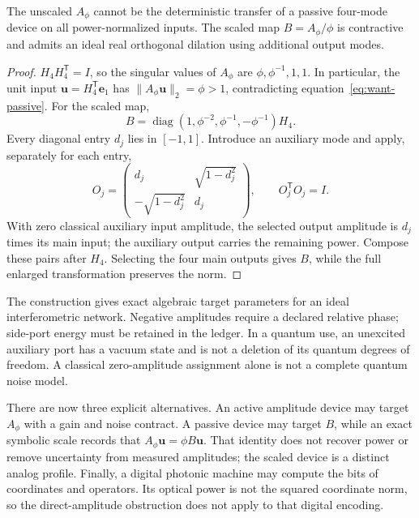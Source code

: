 \begin{proposition}
The unscaled $A_\phi$ cannot be the deterministic transfer of a passive
four-mode device on all power-normalized inputs. The scaled map
$B=A_\phi/\phi$ is contractive and admits an ideal real orthogonal dilation
using additional output modes.
\end{proposition}
\begin{proof}
$H_4H_4^{\mathsf T}=I$, so the singular values of $A_\phi$ are
$\phi,\phi^{-1},1,1$. In particular, the unit input
$\mathbf u=H_4^{\mathsf T}\mathbf e_1$ has
$\|A_\phi\mathbf u\|_2=\phi>1$, contradicting
equation~\eqref{eq:want-passive}. For the scaled map,
\begin{equation}
 B=\operatorname{diag}(1,\phi^{-2},\phi^{-1},-\phi^{-1})H_4.
 \label{eq:want-pinion-scaled}
\end{equation}
Every diagonal entry $d_j$ lies in $[-1,1]$. Introduce an auxiliary mode and
apply, separately for each entry,
\begin{equation}
 O_j=\begin{pmatrix}
 d_j&\sqrt{1-d_j^2}\\-\sqrt{1-d_j^2}&d_j
 \end{pmatrix},\qquad O_j^{\mathsf T}O_j=I.
 \label{eq:want-pinion-dilation}
\end{equation}
With zero classical auxiliary input amplitude, the selected output amplitude
is $d_j$ times its main input; the auxiliary output carries the remaining
power. Compose these pairs after $H_4$. Selecting the four main outputs gives
$B$, while the full enlarged transformation preserves the norm.
\end{proof}

The construction gives exact algebraic target parameters for an ideal
interferometric network. Negative amplitudes require a declared relative phase;
side-port energy must be retained in the ledger. In a quantum use, an
unexcited auxiliary port has a vacuum state and is not a deletion of its
quantum degrees of freedom. A classical zero-amplitude assignment alone is
not a complete quantum noise model.

There are now three explicit alternatives. An active amplitude device may
target $A_\phi$ with a gain and noise contract. A passive device may target
$B$, while an exact symbolic scale records that $A_\phi\mathbf u=\phi B\mathbf u$.
That identity does not recover power or remove uncertainty from measured
amplitudes; the scaled device is a distinct analog profile. Finally, a digital
photonic machine may compute the bits of coordinates and operators. Its
optical power is not the squared coordinate norm, so the direct-amplitude
obstruction does not apply to that digital encoding.

